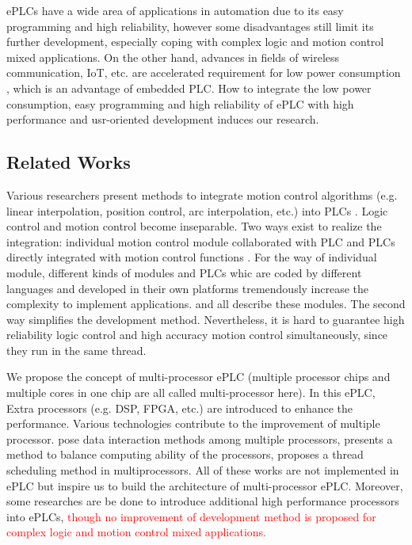 \documentclass[journal,UTF8]{IEEEtran}
\begin{document}
ePLCs have a wide area of applications in automation due to its easy programming and high reliability, however some disadvantages \cite{Hossain2014Advanced} still limit its further development, especially coping with complex logic and motion control mixed applications. On the other hand, advances in fields of wireless communication, IoT, etc. are accelerated requirement for low power consumption \cite{Arshad2017Green}, which is an advantage of embedded PLC. How to integrate the low power consumption, easy programming and high reliability of ePLC with high performance and usr-oriented development induces our research.

\subsection{Related Works}
Various researchers present methods to integrate motion control algorithms (e.g. linear interpolation, position control, arc interpolation, etc.) into PLCs \cite{Ioannides2004Design,Shi2016The,Fang2017Design}. Logic control and motion control become inseparable. Two ways exist to realize the integration: individual motion control module collaborated with PLC \cite{Peng2011Linear} and PLCs directly integrated with motion control functions \cite{Ioannides2004Design,syaichu2011model}. For the way of individual module, different kinds of modules and PLCs whic are coded by different languages and developed in their own platforms tremendously increase the complexity to implement applications. \cite{Peng2011Linear,Qian2014A}  and \cite{Panasonic2011Programmable} all describe these modules. The second way simplifies the development method. Nevertheless, it is hard to guarantee high reliability logic control and high accuracy motion control simultaneously, since they run in the same thread. 

We propose the concept of multi-processor ePLC (multiple processor chips and multiple cores in one chip are all called multi-processor here). In this ePLC, Extra processors (e.g. DSP, FPGA, etc.) are introduced to enhance the performance. Various technologies contribute to the improvement of multiple processor. \cite{Dubois2002Memory,Patel2006Processor} pose data interaction methods among multiple processors, \cite{Zhu2016Providing} presents a method to balance computing ability of the processors, \cite{Albarakat2017MTB} proposes a thread scheduling method in multiprocessors. All of these works are not implemented in ePLC but inspire us to build the architecture of multi-processor ePLC. Moreover, some researches \cite{Hajduk2015Architecture, Chmiel2016An} are be done to introduce additional high performance processors into ePLCs, \textcolor{red}{though no improvement of development method is proposed for complex logic and motion control mixed applications.}
\end{document}
